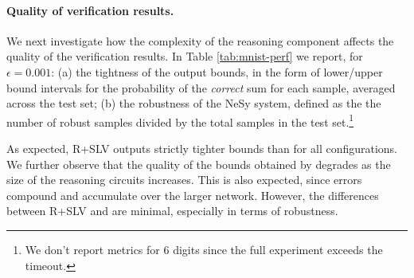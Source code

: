 \paragraph{Quality of verification results.} We next investigate how the complexity of the reasoning component affects the quality of the verification results. In Table \ref{tab:mnist-perf} we report, for $\epsilon=0.001$: (a) the tightness of the output bounds, in the form of lower/upper bound intervals for the probability of the \textit{correct} sum for each sample, averaged across the test set; (b) the robustness of the NeSy system, defined as the the number of robust samples divided by the total samples in the test set.\footnote{We don't report metrics for 6 digits since the full experiment exceeds the timeout.}

As expected, \textsc{R+SLV} outputs strictly tighter bounds than  for all configurations. We further observe that the quality of the bounds obtained by  degrades as the size of the reasoning circuits increases. This is also expected, since errors compound and accumulate over the larger network. However, the differences between \textsc{R+SLV} and  are minimal, especially in terms of robustness.



